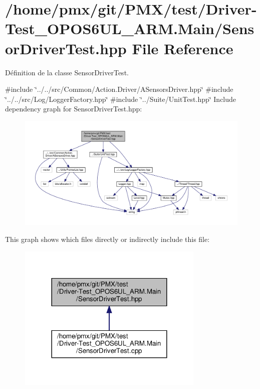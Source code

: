 \hypertarget{Driver-Test__OPOS6UL__ARM_8Main_2SensorDriverTest_8hpp}{}\section{/home/pmx/git/\+P\+M\+X/test/\+Driver-\/\+Test\+\_\+\+O\+P\+O\+S6\+U\+L\+\_\+\+A\+RM.Main/\+Sensor\+Driver\+Test.hpp File Reference}
\label{Driver-Test__OPOS6UL__ARM_8Main_2SensorDriverTest_8hpp}


Définition de la classe Sensor\+Driver\+Test.  


{\ttfamily \#include \char`\"{}../../src/\+Common/\+Action.\+Driver/\+A\+Sensors\+Driver.\+hpp\char`\"{}}\newline
{\ttfamily \#include \char`\"{}../../src/\+Log/\+Logger\+Factory.\+hpp\char`\"{}}\newline
{\ttfamily \#include \char`\"{}../\+Suite/\+Unit\+Test.\+hpp\char`\"{}}\newline
Include dependency graph for Sensor\+Driver\+Test.\+hpp\+:
\nopagebreak
\begin{figure}[H]
\begin{center}
\leavevmode
\includegraphics[width=350pt]{Driver-Test__OPOS6UL__ARM_8Main_2SensorDriverTest_8hpp__incl}
\end{center}
\end{figure}
This graph shows which files directly or indirectly include this file\+:
\nopagebreak
\begin{figure}[H]
\begin{center}
\leavevmode
\includegraphics[width=252pt]{Driver-Test__OPOS6UL__ARM_8Main_2SensorDriverTest_8hpp__dep__incl}
\end{center}
\end{figure}
